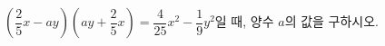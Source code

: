 $\left(\dfrac{2}{5}x-ay\right)\left(ay+\dfrac{2}{5}x\right)=\dfrac{4}{25}x^2-\dfrac{1}{9}y^2$일 때, 양수 $a$의 값을 구하시오.
